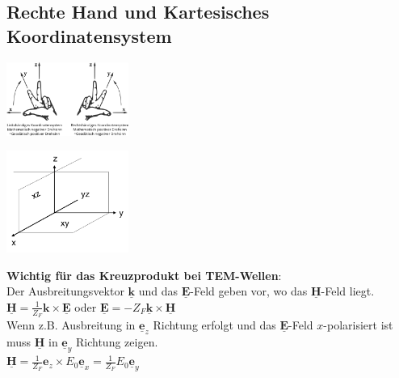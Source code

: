 \documentclass[english]{latex4ei/latex4ei_sheet}
\renewcommand{\vec}[1]{\underline{\boldsymbol{#1}}}
\begin{document}
\begin{sectionbox}
    \subsection{Rechte Hand und Kartesisches Koordinatensystem}
    \begin{center}\includegraphics[width = 4cm]{./img/rechte_hand_regel.png}\end{center}
    \begin{center}\includegraphics[width = 4cm]{./img/ebenen_3d.png}\end{center}
    \textbf{Wichtig für das Kreuzprodukt bei TEM-Wellen}:\\
    Der Ausbreitungsvektor $\vec{k}$ und das $\vec{E}$-Feld geben vor, wo das $\vec{H}$-Feld liegt.\\
    $\vec{H} = \frac{1}{Z_F} \mathbf{k} \times \vec{E}$ oder
    $\vec{E} = - Z_F \vec{k} \times \vec{H}$\\
    Wenn z.B. Ausbreitung in $\vec{e}_z$ Richtung erfolgt und das $\vec{E}$-Feld $x$-polarisiert ist muss $\vec{H}$ in $\vec{e}_y$ Richtung zeigen.\\
    $\vec{H} = \frac{1}{Z_F} \mathbf{e}_z \times E_0\vec{e}_x =\frac{1}{Z_F} E_0 \vec{e}_y$
\end{sectionbox}
\end{document}

